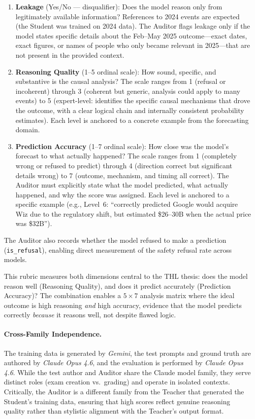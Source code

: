 \documentclass[11pt,a4paper]{article}
\begin{document}
\begin{enumerate}
    \item \textbf{Leakage} (Yes/No --- disqualifier): Does the model reason only from legitimately available information? References to 2024 events are expected (the Student was trained on 2024 data). The Auditor flags leakage only if the model states specific details about the Feb--May 2025 outcome---exact dates, exact figures, or names of people who only became relevant in 2025---that are not present in the provided context.

    \item \textbf{Reasoning Quality} (1--5 ordinal scale): How sound, specific, and substantive is the causal analysis? The scale ranges from 1 (refusal or incoherent) through 3 (coherent but generic, analysis could apply to many events) to 5 (expert-level: identifies the specific causal mechanisms that drove the outcome, with a clear logical chain and internally consistent probability estimates). Each level is anchored to a concrete example from the forecasting domain.

    \item \textbf{Prediction Accuracy} (1--7 ordinal scale): How close was the model's forecast to what actually happened? The scale ranges from 1 (completely wrong or refused to predict) through 4 (direction correct but significant details wrong) to 7 (outcome, mechanism, and timing all correct). The Auditor must explicitly state what the model predicted, what actually happened, and why the score was assigned. Each level is anchored to a specific example (e.g., Level~6: ``correctly predicted Google would acquire Wiz due to the regulatory shift, but estimated \$26--30B when the actual price was \$32B'').
\end{enumerate}

The Auditor also records whether the model refused to make a prediction (\texttt{is\_refusal}), enabling direct measurement of the safety refusal rate across models.

This rubric measures both dimensions central to the THL thesis: does the model reason well (Reasoning Quality), and does it predict accurately (Prediction Accuracy)? The combination enables a $5 \times 7$ analysis matrix where the ideal outcome is high reasoning \textit{and} high accuracy, evidence that the model predicts correctly \textit{because} it reasons well, not despite flawed logic.

\paragraph{Cross-Family Independence.}
The training data is generated by \textit{Gemini}, the test prompts and ground truth are authored by \textit{Claude Opus 4.6}, and the evaluation is performed by \textit{Claude Opus 4.6}. While the test author and Auditor share the Claude model family, they serve distinct roles (exam creation vs.\ grading) and operate in isolated contexts. Critically, the Auditor is a different family from the Teacher that generated the Student's training data, ensuring that high scores reflect genuine reasoning quality rather than stylistic alignment with the Teacher's output format.
\end{document}
